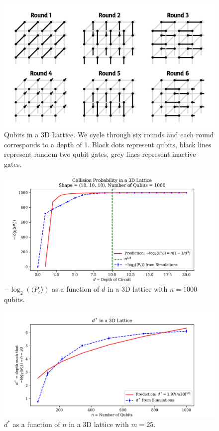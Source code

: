 \documentclass[11pt]{article}
\theoremstyle{definition}
\theoremstyle{plain}
\begin{document}
\begin{figure}[!htb]
\centering
\includegraphics[width=.8\textwidth]{figures/3D/3D_circuit.pdf}
\caption{Qubits in a 3D Lattice. We cycle through six rounds and each round corresponds to a depth of 1. Black dots represent qubits, black lines represent random two qubit gates, grey lines represent inactive gates. }
\label{fig_3d}
\end{figure}
\begin{figure}[!htb]
\centering
\includegraphics[width=.8\textwidth]{figures/3D/cp_mean_log.pdf}
\caption{$-\log_2(\langle P_c \rangle)$ as a function of $d$ in a 3D lattice with $n = 1000$ qubits.}
\label{k_3d}
\end{figure}
\begin{figure}[!htb]
\centering
\includegraphics[width=.8\textwidth]{figures/3D/x_star_30.pdf}
\caption{$d^*$ as a function of $n$ in a 3D lattice with $m = 25$.}
\label{d_star_3d} 
\end{figure} 
\end{document}
